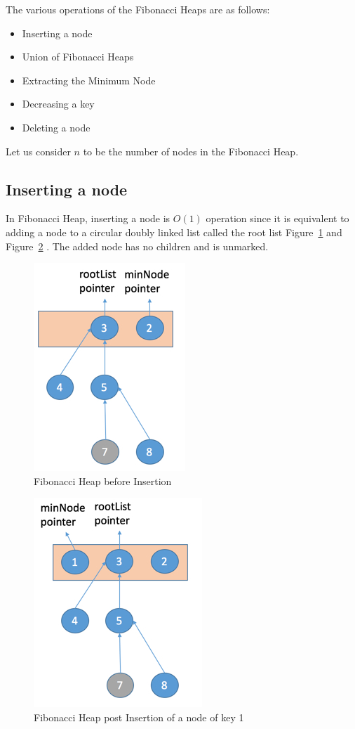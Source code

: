 

The various operations of the Fibonacci Heaps are as follows:
\begin{itemize}
	\item Inserting a node
	\item Union of Fibonacci Heaps
	\item Extracting the Minimum Node
	\item Decreasing a key
	\item Deleting a node
\end{itemize}

Let us consider $n$ to be the number of nodes in the Fibonacci Heap.

\subsection{Inserting a node}
In Fibonacci Heap, inserting a node is $O(1)$ operation since it is equivalent to adding a node to a circular doubly linked list called the root list Figure~\ref{fig:Insertion1} and Figure~\ref{fig:Insertion2} . The added node has no children and is unmarked.
\begin{figure}[H]
	\includegraphics[scale=0.75]{Figures/FibonacciHeapBeforeInsertionOperation}
	\caption{Fibonacci Heap before Insertion}
	\label{fig:Insertion1}
\end{figure}
\begin{figure}[H]
	\includegraphics[scale=0.75]{Figures/FibonacciHeapAfterInsertionOperation}
	\caption{Fibonacci Heap post Insertion of a node of key 1}
	\label{fig:Insertion2}
\end{figure}
